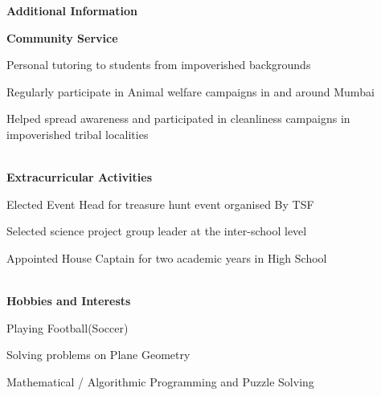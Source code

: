 \documentclass[a4paper,12pt,final]{memoir}
\newcommand{\Sep}{\vspace{1.5em}}
\newcommand{\SmallSep}{\vspace{0.5em}}
\newcommand{\CVSection}[1]
	{\Large\textbf{#1}\par
	\SmallSep\normalsize\normalfont}
\newcommand{\CVItem}[1]
	{\textbf{\color{Plum} #1}}
\begin{document}
\CVSection{Additional Information}
\CVItem{Community Service}\SmallSep\\
\begin{minipage}{13.5cm}
	\begin{compactitem}[\color{Plum}$\circ$]
		{\footnotesize
			\item Personal tutoring to students from impoverished backgrounds
			\item Regularly participate in Animal welfare campaigns in and around Mumbai
			\item Helped spread awareness and participated in cleanliness campaigns in impoverished tribal localities}
	\end{compactitem}
\end{minipage}
\SmallSep\\
\CVItem{Extracurricular Activities}\SmallSep\\
\begin{minipage}{13.5cm}
	\begin{compactitem}[\color{Plum}$\circ$]
		{\footnotesize
			\item Elected Event Head for treasure hunt event organised By TSF
			\item Selected science project group leader at the inter-school level
			\item Appointed House Captain for two academic years in High School}
	\end{compactitem}
\end{minipage}
\SmallSep\\
\CVItem{Hobbies and Interests}\SmallSep\\
\begin{minipage}{13.5cm}
	\begin{compactitem}[\color{Plum}$\circ$]
		{\footnotesize
			\item Playing Football(Soccer)
			\item Solving problems on Plane Geometry
			\item Mathematical / Algorithmic Programming and Puzzle Solving}
	\end{compactitem}
\end{minipage}
\Sep\\

\end{document}
